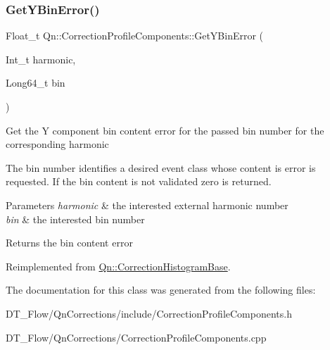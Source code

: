 \subsubsection{\texorpdfstring{Get\+Y\+Bin\+Error()}{GetYBinError()}}
{\footnotesize\ttfamily Float\+\_\+t Qn\+::\+Correction\+Profile\+Components\+::\+Get\+Y\+Bin\+Error (\begin{DoxyParamCaption}\item[{Int\+\_\+t}]{harmonic,  }\item[{Long64\+\_\+t}]{bin }\end{DoxyParamCaption})\hspace{0.3cm}{\ttfamily [virtual]}}

Get the Y component bin content error for the passed bin number for the corresponding harmonic

The bin number identifies a desired event class whose content is error is requested. If the bin content is not validated zero is returned.


\begin{DoxyParams}{Parameters}
{\em harmonic} & the interested external harmonic number \\
\hline
{\em bin} & the interested bin number \\
\hline
\end{DoxyParams}
\begin{DoxyReturn}{Returns}
the bin content error 
\end{DoxyReturn}


Reimplemented from \mbox{\hyperlink{classQn_1_1CorrectionHistogramBase_ad9b6bbde5fc1d8b5c282d33bd1bc50b4}{Qn\+::\+Correction\+Histogram\+Base}}.



The documentation for this class was generated from the following files\+:\begin{DoxyCompactItemize}
\item 
D\+T\+\_\+\+Flow/\+Qn\+Corrections/include/Correction\+Profile\+Components.\+h\item 
D\+T\+\_\+\+Flow/\+Qn\+Corrections/Correction\+Profile\+Components.\+cpp\end{DoxyCompactItemize}
